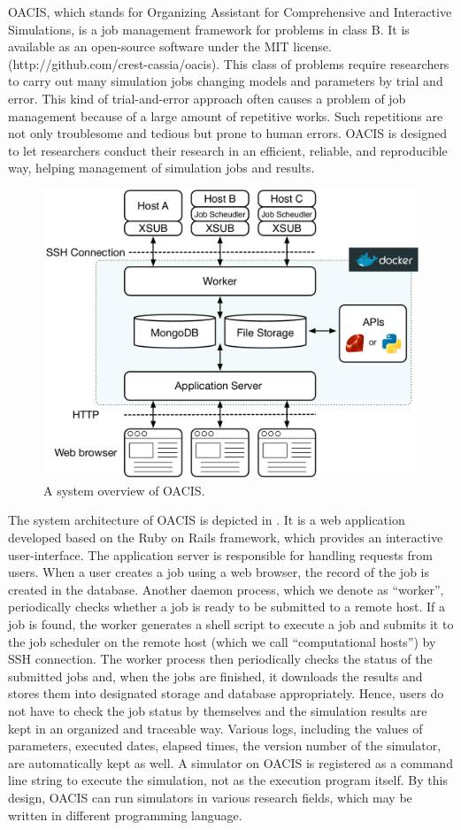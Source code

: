 OACIS, which stands for Organizing Assistant for Comprehensive and Interactive Simulations, is a job management framework for problems in class B\cite{murase_phys_proc}.
It is available as an open-source software under the MIT license. (http://github.com/crest-cassia/oacis).
This class of problems require researchers to carry out many simulation jobs changing models and parameters by trial and error.
This kind of trial-and-error approach often causes a problem of job management because of a large amount of repetitive works.
Such repetitions are not only troublesome and tedious but prone to human errors.
OACIS is designed to let researchers conduct their research in an efficient, reliable, and reproducible way, helping management of simulation jobs and results.

\begin{figure}
  \centering
  \includegraphics[width=.8\linewidth]{Figs.murase/oacis_overview.pdf}
  \caption{A system overview of OACIS.}
  \label{fig:oacis_overview}
\end{figure}

The system architecture of OACIS is depicted in .
It is a web application developed based on the Ruby on Rails framework, which provides an interactive user-interface.
The application server is responsible for handling requests from users. When a user creates a job using a web browser, the record of the job is created in the database.
Another daemon process, which we denote as ``worker'', periodically checks whether a job is ready to be submitted to a remote host.
If a job is found, the worker generates a shell script to execute a job and submits it to the job scheduler on the remote host (which we call ``computational hosts'') by SSH connection.
The worker process then periodically checks the status of the submitted jobs and, when the jobs are finished, it downloads the results and stores them into designated storage and database appropriately.
Hence, users do not have to check the job status by themselves and the simulation results are kept in an organized and traceable way.
Various logs, including the values of parameters, executed dates, elapsed times, the version number of the simulator, are automatically kept as well.
A simulator on OACIS is registered as a command line string to execute the simulation, not as the execution program itself.
By this design, OACIS can run simulators in various research fields, which may be written in different programming language.

